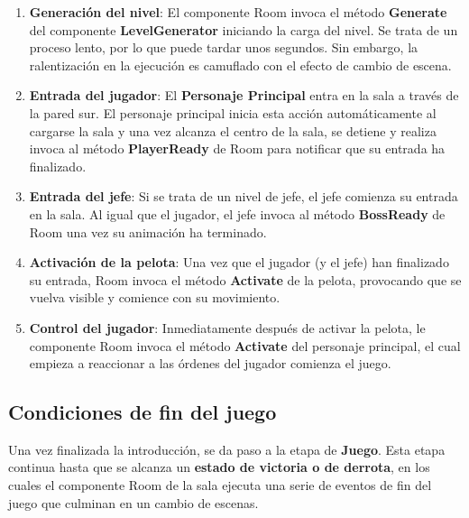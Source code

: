 \begin{enumerate}
\item \textbf{Generación del nivel}: El componente Room invoca el método \textbf{Generate} del componente \textbf{LevelGenerator} iniciando la carga del nivel. Se trata de un proceso lento, por lo que puede tardar unos segundos. Sin embargo, la ralentización en la ejecución es camuflado con el efecto de cambio de escena.
\item \textbf{Entrada del jugador}: El \textbf{Personaje Principal} entra en la sala a través de la pared sur. El personaje principal inicia esta acción automáticamente al cargarse la sala y una vez alcanza el centro de la sala, se detiene y realiza invoca al método \textbf{PlayerReady} de Room para notificar que su entrada ha finalizado.
\item \textbf{Entrada del jefe}: Si se trata de un nivel de jefe, el jefe comienza su entrada en la sala. Al igual que el jugador, el jefe invoca al método \textbf{BossReady} de Room una vez su animación ha terminado.
\item \textbf{Activación de la pelota}: Una vez que el jugador (y el jefe) han finalizado su entrada, Room invoca el método \textbf{Activate} de la pelota, provocando que se vuelva visible y comience con su movimiento. 
\item \textbf{Control del jugador}: Inmediatamente después de activar la pelota, le componente Room invoca el método \textbf{Activate} del personaje principal, el cual empieza a reaccionar a las órdenes del jugador comienza el juego.
\end{enumerate}

\subsection{Condiciones de fin del juego}
Una vez finalizada la introducción, se da paso a la etapa de \textbf{Juego}. Esta etapa continua hasta que se alcanza un \textbf{estado de victoria o de derrota}, en los cuales el componente Room de la sala ejecuta una serie de eventos de fin del juego que culminan en un cambio de escenas.

